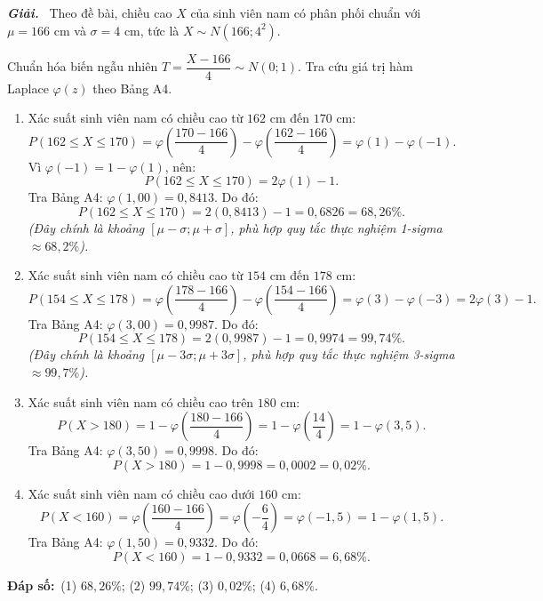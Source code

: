 \documentclass[12pt,a4paper]{article}
\theoremstyle{definition}
\newcommand{\giai}{\noindent\textbf{\textit{Giải.}}\ }
\newcommand{\dapso}[1]{\noindent\textbf{Đáp số:}\ #1}
\begin{document}
\giai
Theo đề bài, chiều cao $X$ của sinh viên nam có phân phối chuẩn với $\mu = 166\text{ cm}$ và $\sigma = 4\text{ cm}$, tức là $X \sim N(166; 4^2)$.

Chuẩn hóa biến ngẫu nhiên $T = \dfrac{X - 166}{4} \sim N(0; 1)$. Tra cứu giá trị hàm Laplace $\varphi(z)$ theo Bảng A4.

\begin{enumerate}[label=(\arabic*)]
    \item Xác suất sinh viên nam có chiều cao từ $162\text{ cm}$ đến $170\text{ cm}$:
    \[
    P(162 \le X \le 170) = \varphi\left(\frac{170 - 166}{4}\right) - \varphi\left(\frac{162 - 166}{4}\right) = \varphi(1) - \varphi(-1).
    \]
    Vì $\varphi(-1) = 1 - \varphi(1)$, nên:
    \[
    P(162 \le X \le 170) = 2\varphi(1) - 1.
    \]
    Tra Bảng A4: $\varphi(1{,}00) = 0{,}8413$. Do đó:
    \[
    P(162 \le X \le 170) = 2(0{,}8413) - 1 = 0{,}6826 = 68{,}26\%.
    \]
    \textit{(Đây chính là khoảng $[\mu - \sigma; \mu + \sigma]$, phù hợp quy tắc thực nghiệm 1-sigma $\approx 68{,}2\%$).}

    \item Xác suất sinh viên nam có chiều cao từ $154\text{ cm}$ đến $178\text{ cm}$:
    \[
    P(154 \le X \le 178) = \varphi\left(\frac{178 - 166}{4}\right) - \varphi\left(\frac{154 - 166}{4}\right) = \varphi(3) - \varphi(-3) = 2\varphi(3) - 1.
    \]
    Tra Bảng A4: $\varphi(3{,}00) = 0{,}9987$. Do đó:
    \[
    P(154 \le X \le 178) = 2(0{,}9987) - 1 = 0{,}9974 = 99{,}74\%.
    \]
    \textit{(Đây chính là khoảng $[\mu - 3\sigma; \mu + 3\sigma]$, phù hợp quy tắc thực nghiệm 3-sigma $\approx 99{,}7\%$).}

    \item Xác suất sinh viên nam có chiều cao trên $180\text{ cm}$:
    \[
    P(X > 180) = 1 - \varphi\left(\frac{180 - 166}{4}\right) = 1 - \varphi\left(\frac{14}{4}\right) = 1 - \varphi(3{,}5).
    \]
    Tra Bảng A4: $\varphi(3{,}50) = 0{,}9998$. Do đó:
    \[
    P(X > 180) = 1 - 0{,}9998 = 0{,}0002 = 0{,}02\%.
    \]

    \item Xác suất sinh viên nam có chiều cao dưới $160\text{ cm}$:
    \[
    P(X < 160) = \varphi\left(\frac{160 - 166}{4}\right) = \varphi\left(-\frac{6}{4}\right) = \varphi(-1{,}5) = 1 - \varphi(1{,}5).
    \]
    Tra Bảng A4: $\varphi(1{,}50) = 0{,}9332$. Do đó:
    \[
    P(X < 160) = 1 - 0{,}9332 = 0{,}0668 = 6{,}68\%.
    \]
\end{enumerate}

\dapso{(1) $68{,}26\%$; \quad (2) $99{,}74\%$; \quad (3) $0{,}02\%$; \quad (4) $6{,}68\%$.}
\end{document}
